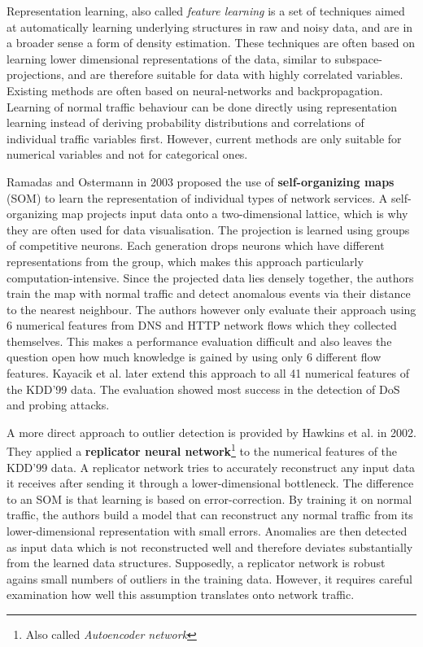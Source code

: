 \documentclass[a4paper,12pt,twoside]{report}
\begin{document}
Representation learning, also called \textit{feature learning} is a set of techniques aimed at automatically learning underlying structures in raw and noisy data, and are in a broader sense a form of density estimation. These techniques are often based on learning lower dimensional representations of the data, similar to subspace-projections, and are therefore suitable for data with highly correlated variables. Existing methods are often based on neural-networks and backpropagation. Learning of normal traffic behaviour can be done directly using representation learning instead of deriving probability distributions and correlations of individual traffic variables first. However, current methods are only suitable for numerical variables and not for categorical ones.



Ramadas and Ostermann \cite{ramadas2003detecting} in 2003 proposed the use of \textbf{self-organizing maps} (SOM) to learn the representation of individual types of network services. A self-organizing map projects input data onto a two-dimensional lattice, which is why they are often used for data visualisation. The projection is learned using groups of competitive neurons. Each generation drops neurons which have different representations from the group, which makes this approach particularly computation-intensive. Since the projected data lies densely together, the authors train the map with normal traffic and detect anomalous events via their distance to the nearest neighbour. The authors however only evaluate their approach using 6 numerical features from DNS and HTTP network flows which they collected themselves. This makes a performance evaluation difficult and also leaves the question open how much knowledge is gained by using only 6 different flow features. Kayacik et al. \cite{kayacik2007hierarchical} later extend this approach to all 41 numerical features of the KDD'99 data. The evaluation showed most success in the detection of DoS and probing attacks.

A more direct approach to outlier detection is provided by Hawkins et al. \cite{hawkins_outlier_2002} in 2002. They applied a \textbf{replicator neural network}\footnote{Also called \textit{Autoencoder network}} to the numerical features of the KDD'99 data. A replicator network tries to accurately reconstruct any input data it receives after sending it through a lower-dimensional bottleneck. The difference to an SOM is that learning is based on error-correction. By training it on normal traffic, the authors build a model that can reconstruct any normal traffic from its lower-dimensional representation with small errors. Anomalies are then detected as input data which is not reconstructed well and therefore deviates substantially from the learned data structures. Supposedly, a replicator network is robust agains small numbers of outliers in the training data. However, it requires careful examination how well this assumption translates onto network traffic. 
\end{document}
